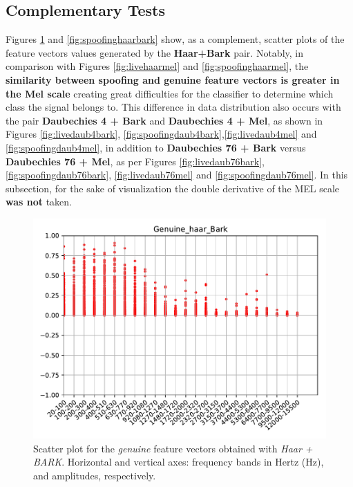 		\FloatBarrier
		
	\subsection{Complementary Tests}
		\par Figures \ref{fig:livehaarbark} and \ref{fig:spoofinghaarbark} show, as a complement, scatter plots of the feature vectors values generated by the \textbf{Haar+Bark} pair. Notably, in comparison with Figures \ref{fig:livehaarmel} and \ref{fig:spoofinghaarmel}, the \textbf{similarity between spoofing and genuine feature vectors is greater in the Mel scale} creating great difficulties for the classifier to determine which class the signal belongs to. This difference in data distribution also occurs with the pair \textbf{Daubechies 4 + Bark} and \textbf{Daubechies 4 + Mel}, as shown in Figures \ref{fig:livedaub4bark}, \ref{fig:spoofingdaub4bark},\ref{fig:livedaub4mel} and \ref{fig:spoofingdaub4mel}, in addition to \textbf{Daubechies 76 + Bark} versus \textbf{Daubechies 76 + Mel}, as per Figures \ref{fig:livedaub76bark}, \ref{fig:spoofingdaub76bark}, \ref{fig:livedaub76mel} and \ref{fig:spoofingdaub76mel}. In this subsection, for the sake of visualization the double derivative of the MEL scale \textbf{was not} taken.
		\\
		\begin{figure}
			\centering
			\includegraphics[scale=.7]{images/results/barkVersusMel/Genuine_haar_Bark.pdf}
			\caption{Scatter plot for the \textit{genuine} feature vectors obtained with \textit{Haar + BARK}. Horizontal and vertical axes: frequency bands in Hertz (Hz), and amplitudes, respectively.}
			\label{fig:livehaarbark}
		\end{figure}
